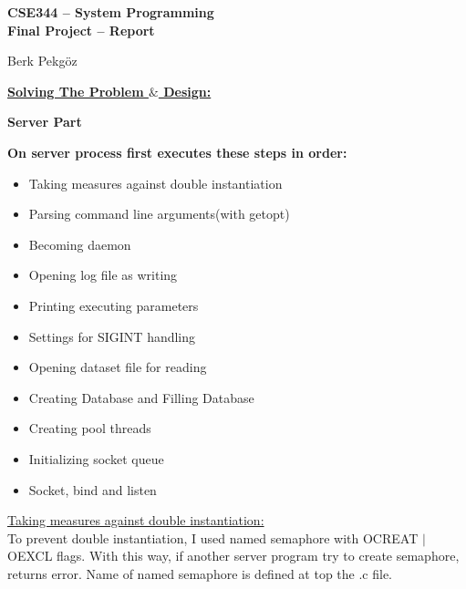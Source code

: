 \documentclass[12pt]{report}
\renewcommand{\_}{\kern-1.5pt\textunderscore\kern-1.5pt}
\begin{document}
\begin{Center}
{\fontsize{16pt}{19.2pt}\selectfont \textbf{CSE344 – System Programming}}\\
{\fontsize{16pt}{19.2pt}\selectfont \textbf{Final Project – Report}}
\end{Center}
\begin{FlushLeft}
{\fontsize{14pt}{16.8pt}\selectfont Berk Pekgöz}\\
{\fontsize{14pt}{16.8pt}}
\end{FlushLeft}
\begin{FlushLeft}
{\fontsize{18pt}{21.6pt}\selectfont \textbf{\uline{Solving The Problem $\&$  Design:}}}
\end{FlushLeft}
\begin{FlushLeft}
{\fontsize{16pt}{19.2pt}\selectfont \textbf{Server Part}}
\end{FlushLeft}
\begin{FlushLeft}
\textbf{On server process first executes these steps in order:}
\end{FlushLeft}
\begin{itemize}
	\item Taking measures against double instantiation
	\item Parsing command line arguments(with getopt)
	\item Becoming daemon
	\item Opening log file as writing
	\item Printing executing parameters
	\item Settings for SIGINT handling
	\item Opening dataset file for reading
	\item Creating Database and Filling Database
	\item Creating pool threads
	\item Initializing socket queue
	\item Socket, bind and listen
\end{itemize}

\vspace{\baselineskip}
\begin{FlushLeft}
\uline{Taking measures against double instantiation:}\\
To prevent double instantiation, I used named semaphore with O\_CREAT $ \vert $  O\_EXCL flags. With this way, if another server program try to create semaphore, returns error. Name of named semaphore is defined at top the .c file.
\end{FlushLeft}
\end{document}
